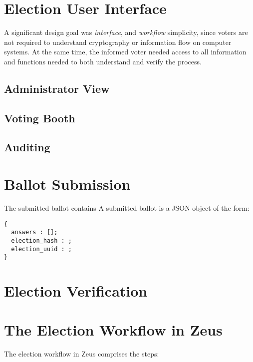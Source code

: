 \documentclass[runningheads,a4paper]{llncs}
\begin{document}
\section{Election User Interface}
A significant design goal was \emph{interface},
and \emph{workflow} simplicity,
since voters are not required to understand cryptography
or information flow on computer systems.
At the same time,
the informed voter needed access to all information and functions needed
to both understand and verify the process.

\subsection{Administrator View}
\subsection{Voting Booth}
\subsection{Auditing}


\section{Ballot Submission}

The submitted ballot contains
A submitted ballot is a JSON object of the form:
\begin{verbatim}
{
  answers : [];
  election_hash : ;
  election_uuid : ;
}
\end{verbatim}

\section{Election Verification}


\section{The Election Workflow in Zeus}

The election workflow in Zeus comprises the steps:
\end{document}
